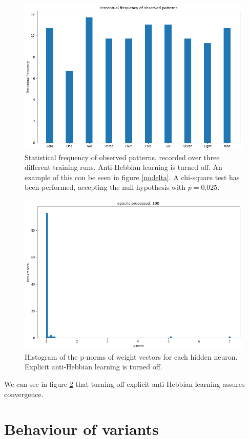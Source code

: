 \documentclass[a4paper]{report}
\begin{document}
\begin{figure} [H]
    \centering
    \includegraphics [width=12cm ] {o/bar1.png}
    \caption{Statistical frequency of observed patterns, recorded over three different training runs. Anti-Hebbian learning is turned off. An example of this con be seen in figure \ref{nodelta}. A chi-square test has been performed, accepting the null hypothesis with $p  = 0.025$.}
    \label{o/cerchio2}
\end{figure}

\begin{figure} [H]
\centering
\includegraphics [width=12cm ] {o/ii_hist.png}
\caption{Histogram of the p-norms of weight vectors for each hidden neuron. Explicit anti-Hebbian learning is turned off.}
\label{noh_hist}
\end{figure}

We can see in figure \ref{noh_hist} that turning off explicit anti-Hebbian learning assures convergence.

\chapter{Behaviour of variants}
\end{document}
